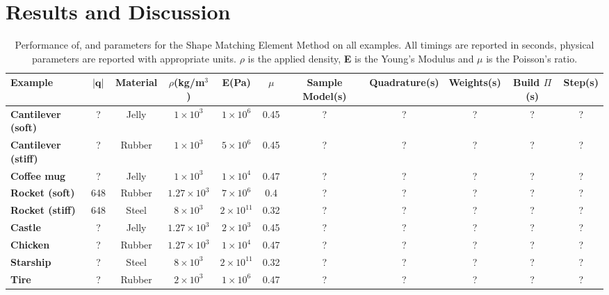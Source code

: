 %
\section{Results and Discussion}

\begin{table}[h]
  \caption{Performance of, and parameters for the Shape Matching Element Method on all examples. All timings are reported in seconds, physical  parameters are
  reported with appropriate units. $\rho$ is the applied density, \textbf{E} is the  Young's Modulus and $\mu$ is the Poisson's ratio.
  }
  \label{tbl:perf}
  \begin{center}
  \begin{tabular}{l c c c c c c c c c c}
   \textbf{Example} & $|\mathbf{q}|$ & \textbf{Material}&  $\rho$(kg/m$^3$) & \textbf{E}(Pa) & $\mu$ &\textbf{Sample Model}(s) & \textbf{Quadrature}(s)& \textbf{Weights}(s)& \textbf{Build $\Pi$}(s)& \textbf{Step}(s)\\
   \hline 
   \rowcolor[HTML]{DAE8FC} 
   \textbf{Cantilever (soft)}       & ? & Jelly & $1 \times 10^3$ & $1 \times 10^6$& 0.45 & ? & ? & ? & ? & ? \\
   \textbf{Cantilever (stiff)}      & ? & Rubber & $1 \times 10^3$ & $5 \times 10^6$ & 0.45 & ? & ? & ? & ? & ? \\
   \textbf{Coffee mug}              & ? & Jelly & $1 \times 10^3$ & $1 \times 10^4$ & 0.47 & ? & ? & ? & ? & ?  \\
   \textbf{Rocket (soft)}           & 648 & Rubber & $1.27 \times 10^3$ & $7 \times 10^6$ & 0.4 & ? & ? & ? & ? & ? \\
   \textbf{Rocket (stiff)}          & 648 & Steel & $8 \times 10^3$ & $2 \times 10^{11}$ & 0.32 & ? & ? & ? & ? & ? \\
   \textbf{Castle}                  & ? & Jelly & $1.27 \times 10^3$ & $2 \times 10^3$ & 0.45 & ? & ? & ? & ? & ? \\
   \textbf{Chicken}                 & ? & Rubber & $1.27 \times 10^3$ & $1 \times 10^4$ & 0.47 & ? & ? & ? & ? & ? \\
   \textbf{Starship}                & ? & Steel & $8 \times 10^3$ & $2 \times 10^{11}$ & 0.32 & ? & ? & ? & ? & ? \\
   \textbf{Tire}                    & ? & Rubber & $2 \times 10^3$ & $1 \times 10^6$ & 0.47 & ? & ? & ? & ? & ? \\
   \hline
  \end{tabular}
  \end{center}
  
  \end{table}

